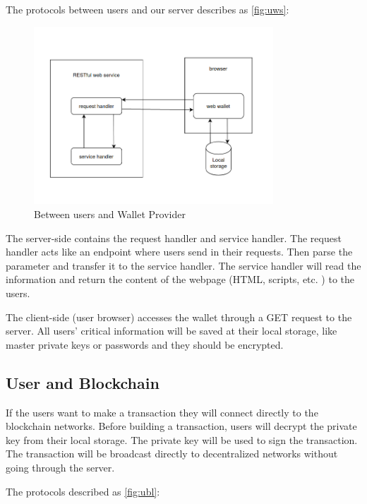 The protocols between users and our server describes as \autoref{fig:uws}:

\begin{figure}[ht!]
    \centering
    \includegraphics[width=0.8\textwidth]{images/design_uws.png}
    \caption[Between users and Wallet Provider]{Between users and Wallet Provider}
    \label{fig:uws}
\end{figure}

The server-side contains the request handler and service handler. The request handler acts like an endpoint where users send in their requests. Then parse the parameter and transfer it to the service handler. The service handler will read the information and return the content of the webpage (HTML, scripts, etc. ) to the users.

The client-side (user browser) accesses the wallet through a GET request to the server. All users' critical information will be saved at their local storage, like master private keys or passwords and they should be encrypted.

\subsection{User and Blockchain}

If the users want to make a transaction they will connect directly to the blockchain networks. Before building a transaction, users will decrypt the private key from their local storage. The private key will be used to sign the transaction. The transaction will be broadcast directly to decentralized networks without going through the server.

The protocols described as \autoref{fig:ubl}:

